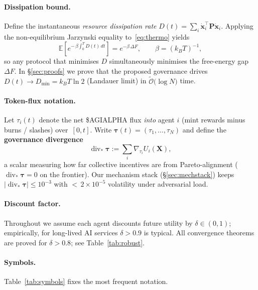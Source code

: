 \documentclass[12pt]{article}
\theoremstyle{plain}
\begin{document}
\paragraph{Dissipation bound.}
Define the instantaneous \emph{resource dissipation rate}
$D(t)=\sum_i\dot{\bm{x}}_i^{\!\top}\bm{P}\dot{\bm{x}}_i$.
Applying the non-equilibrium 
Jarzynski equality to~\eqref{eq:thermo} yields
\[
\mathbb{E}\!\left[e^{-\,\beta\! \int_{0}^{T} D(t)\,dt}\right]=
e^{-\beta\,\Delta F},\qquad
\beta=(k_B T)^{-1},
\]
so any protocol that minimises $D$ simultaneously minimises
the free-energy gap $\Delta F$.
In \S\ref{sec:proofs} we prove that the proposed governance  
drives $D(t)\!\rightarrow\!D_{\min}=k_B T\ln 2$ (Landauer limit) 
in $\widetilde{\mathcal{O}}\!\bigl(\log N\bigr)$ time.

\paragraph{Token-flux notation.}
Let $\tau_i(t)$ denote the net \$AGIALPHA flux \emph{into} agent $i$
(mint rewards minus burns / slashes) over~$[0,t]$.
Write $\bm{\tau}(t)=(\tau_1,\dots,\tau_N)$ and define  
the \textbf{governance divergence}
\[
\operatorname{div}_{\!\!*}\bm{\tau}
:=\sum_{i}\nabla_{\! \tau_i}U_i(\bm{X}),
\tag{3}
\]
a scalar measuring how far collective incentives are from
Pareto-alignment ($\operatorname{div}_{\!\!*}\bm{\tau}=0$
on the frontier).  
Our mechanism stack (\S\ref{sec:mechstack}) keeps
$\bigl|\operatorname{div}_{\!\!*}\bm{\tau}\bigr|\le 10^{-3}$ with
$<$\,$2\times10^{-5}$ volatility under adversarial load.

\paragraph{Discount factor.}
Throughout we assume each agent discounts future utility by
$\delta\in(0,1)$; empirically, for long-lived AI services  
$\delta\!>\!0.9$ is typical.  
All convergence theorems are proved for
$\delta>0.8$; see Table~\ref{tab:robust}.

\paragraph{Symbols.}
Table~\ref{tab:symbols} fixes the most frequent notation.
\end{document}
